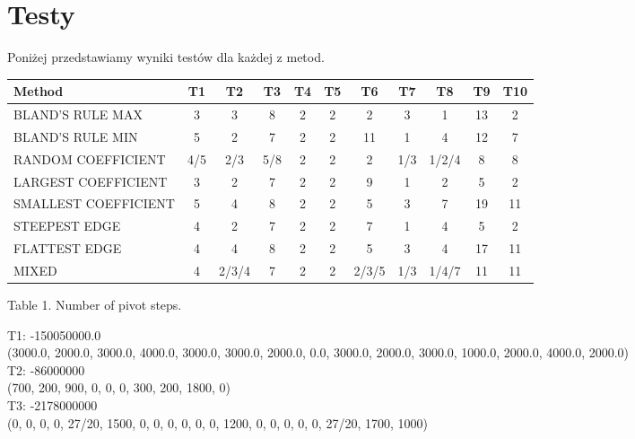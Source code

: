 \documentclass[a4paper]{article}
\begin{document}
\section{Testy}
Poniżej przedstawiamy wyniki testów dla każdej z metod.
\vspace{0.2in}
\vspace{0.5in}
\begin{tabular}{|l|c|c|c|c|c|c|c|c|c|c|}
Method & T1 & T2 & T3 & T4 &  T5 &  T6 &  T7 &  T8 & T9 & T10\\\hline
BLAND'S RULE MAX & 3 & 3 & 8 & 2 & 2 & 2 & 3 & 1 & 13 & 2\\
BLAND'S RULE MIN & 5 & 2 & 7 & 2 &  2 & 11 & 1 & 4 & 12 & 7\\ 
RANDOM COEFFICIENT & 4/5 & 2/3 & 5/8 & 2 & 2 & 2 & 1/3 & 1/2/4 & 8 & 8\\
LARGEST COEFFICIENT & 3 & 2 & 7 & 2 &  2 & 9 & 1 & 2 & 5 & 2\\
SMALLEST COEFFICIENT & 5 & 4 & 8 & 2 &  2 & 5 & 3 & 7 & 19 & 11\\
STEEPEST EDGE & 4 & 2 & 7 & 2 &  2 & 7 & 1 & 4 & 5 & 2\\
FLATTEST EDGE & 4 & 4 & 8 & 2 &  2 & 5 & 3 & 4 & 17 & 11\\
MIXED & 4 & 2/3/4 & 7 & 2 &  2 & 2/3/5 & 1/3 & 1/4/7 & 11 & 11
\end{tabular}
\vspace{0.05in}
\begin{center}
Table 1. Number of pivot steps.
\end{center}
\textcolor{green!40}{T1}:  -150050000.0\\
(3000.0, 2000.0, 3000.0, 4000.0, 3000.0, 3000.0, 2000.0, 0.0, 3000.0, 2000.0, 3000.0, 1000.0, 2000.0, 4000.0, 2000.0) \\
\textcolor{green!40}{T2}: -86000000\\
(700, 200, 900, 0, 0, 0, 300, 200, 1800, 0)\\
\textcolor{green!40}{T3}: -2178000000\\
(0, 0, 0, 0, 27/20, 1500, 0, 0, 0, 0, 0, 0, 1200, 0, 0, 0, 0, 0, 27/20, 1700, 1000)\\
\end{document}
